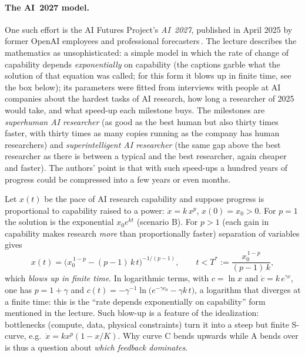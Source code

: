 \paragraph{The AI~2027 model.}
One such effort is the AI Futures Project's \emph{AI~2027}, published in April 2025 by former OpenAI employees and professional forecasters\,\citep{aifutures2025}. The lecture describes the mathematics as unsophisticated: a simple model in which the rate of change of capability depends
\emph{exponentially} on capability (the captions garble what the solution of that equation was called\flag; for this form it blows up in finite time, see the box below); its parameters were fitted from interviews with people at AI companies about the hardest tasks of AI research, how long a researcher of 2025 would take, and what speed-up each milestone buys.
The milestones are \emph{superhuman AI researcher} (as good as the best human but also thirty times faster, with thirty times as many copies running as the company has human researchers) and \emph{superintelligent AI researcher} (the same gap above the best
researcher as there is between a typical and the best researcher, again cheaper and faster). The authors' point is that with such speed-ups a hundred years of progress could be compressed into a few years or even months.

\begin{beyond}\label{box:toy-ode}
Let $x(t)$ be the pace of AI research capability and suppose progress is proportional to capability raised to a power: $\dot x=k\,x^{p}$, $x(0)=x_0>0$. For $p=1$ the solution is the exponential $x_0e^{kt}$ (scenario B). For $p>1$
(each gain in capability makes research \emph{more} than proportionally faster) separation of variables gives
\[
   x(t)=\big(x_0^{\,1-p}-(p-1)\,k\,t\big)^{-1/(p-1)},\qquad t<T^*:=\frac{x_0^{\,1-p}}{(p-1)\,k},
\]
which \emph{blows up in finite time}. In logarithmic terms, with $c=\ln x$ and $\dot c=k\,e^{\gamma c}$, one has $p=1+\gamma$ and $c(t)=-\gamma^{-1}\ln\!\big(e^{-\gamma c_0}-\gamma k\,t\big)$, a logarithm that diverges at a finite time: this is the ``rate depends exponentially on capability'' form mentioned in the lecture.
Such blow-up is a feature of the idealization: bottlenecks (compute, data, physical constraints) turn it into a steep but finite S-curve, e.g.\ $\dot x=kx^{p}(1-x/K)$. Why curve C bends upwards while A bends over is thus a question about \emph{which feedback dominates}.
\end{beyond}

